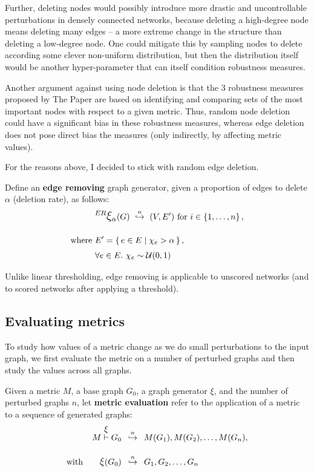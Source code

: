 Further, deleting nodes would possibly introduce more drastic and uncontrollable perturbations in densely connected networks, because deleting a high-degree node means deleting many edges -- a more extreme change in the structure than deleting a low-degree node.
One could mitigate this by sampling nodes to delete according some clever non-uniform distribution, but then the distribution itself would be another hyper-parameter that can itself condition robustness measures.

Another argument against using node deletion is that the 3 robustness measures proposed by The Paper are based on identifying and comparing sets of the most important nodes with respect to a given metric.
Thus, random node deletion could have a significant bias in these robustness measures, whereas edge deletion does not pose direct bias the measures (only indirectly, by affecting metric values).

For the reasons above, I decided to stick with random edge deletion.

\parspace

Define an \textbf{edge removing} graph generator, given a proportion of edges to delete $\alpha$ (deletion rate), as follows:
\begin{align}
    &\mathlarger{^{ER} \mathlarger{\xi}}_\alpha(G) \ \overset{n}{\hookrightarrow}\ (V, E')~\text{for}~i\in \integersto{n}, \label{eq:edge_removing_generator}\\[10pt]
    \text{where}~&E' = \Set{ e \in E }{ \chi_e > \alpha }, \nonumber \\
    &\forall e \in E.\ \chi_e\sim\mathcal{U}(0,1) \nonumber
\end{align}


Unlike linear thresholding, edge removing is applicable to unscored networks (and to scored networks after applying a threshold).

\subsection{Evaluating metrics}\label{sec:evaluating_metrics}

To study how values of a metric change as we do small perturbations to the input graph, we first evaluate the metric on a number of perturbed graphs and then study the values across all graphs.

Given a metric $M$, a base graph $G_0$, a graph generator $\xi$, and the number of perturbed graphs $n$, let \textbf{metric evaluation} refer to the application of a metric to a sequence of generated graphs:
\begin{align}
    M \overset{\mathlarger{\xi}}{\vdash} G_0 &\generates{n} M(G_1), M(G_2), \dots, M(G_n), \\[10pt]
    \text{with}\qquad \mathlarger{\xi}(G_0) &\generates{n} G_1, G_2, \dots, G_n \nonumber
\end{align}

